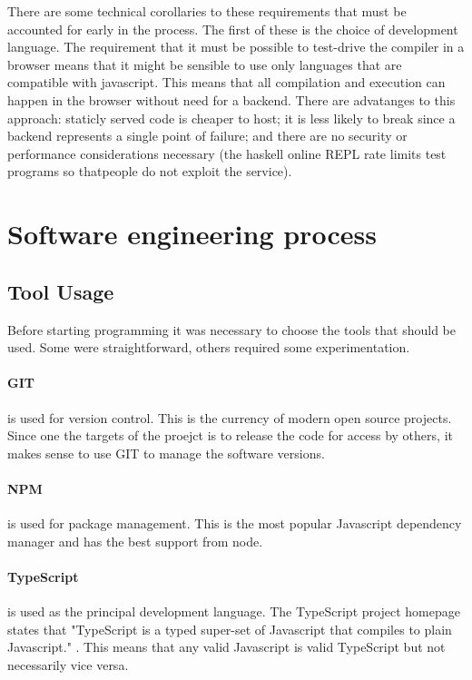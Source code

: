 \documentclass{article}
\begin{document}
There are some technical corollaries to these requirements that must be accounted for early in the process. The first of these is the choice of development language. The requirement that it must be possible to test-drive the compiler in a browser means that it might be sensible to use only languages that are compatible with javascript. This means that all compilation and execution can happen in the browser without need for a backend. There are advatanges to this approach: staticly served code is cheaper to host; it is less likely to break since a backend represents a single point of failure; and there are no security or performance considerations necessary (the haskell online REPL rate limits test programs so thatpeople do not exploit the service).

\section{Software engineering process}

\subsection{Tool Usage}

Before starting programming it was necessary to choose the tools that should be used. Some were straightforward, others required some experimentation.

\paragraph{GIT} is used for version control. This is the currency of modern open source projects. Since one the targets of the proejct is to release the code for access by others, it makes sense to use GIT to manage the software versions.

\paragraph{NPM} is used for package management. This is the most popular Javascript dependency manager and has the best support from node.

\paragraph{TypeScript} is used as the principal development language. The TypeScript project homepage states that "TypeScript is a typed super-set of Javascript that compiles to plain Javascript." \cite{typescript}. This means that any valid Javascript is valid TypeScript but not necessarily vice versa.
\end{document}
